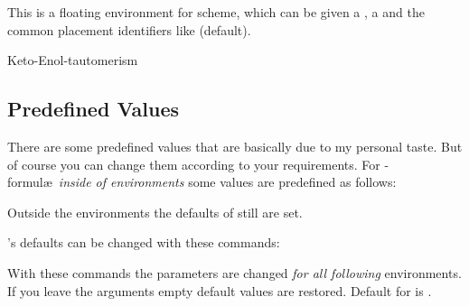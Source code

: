 \documentclass[toc=index,DIV10]{cnpkgdoc}
\begin{document}
This is a floating environment for scheme, which can be given a ,
a  and the common placement identifiers like  (default).
\begin{beispiel}
\begin{rxnscheme}{Keto-Enol-tautomerism}
 \arrow[,<=>]{}{}
\end{rxnscheme}
\end{beispiel}

\subsection{Predefined Values}
There are some predefined values that are basically due to my personal taste. But
of course you can change them according to your requirements. For %
-formul\ae\ \emph{inside of \mychemistry environments} some values are predefined
as follows:
\begin{beispiel}
 \setatomsep{1.8em}
 \setcrambond{3pt}{0.5pt}{1pt}
\end{beispiel}
Outside the \mychemistry environments the defaults of  still are
set.
\begin{beispiel}
 \begin{rxn}
 \end{rxn}
\end{beispiel}

\mychemistry's defaults can be changed with these commands:
\begin{beschreibung}
\end{beschreibung}
With these commands the parameters are changed \emph{for all following}
\mychemistry environments. If you leave the arguments empty default values are
restored. Default for  is .

\begin{beispiel}
 \setbondlength{2.1em}\setbondshape{5pt}{1pt}{2pt}\setatomsize{\Large}
 \begin{rxn}
 \end{rxn}
 \setbondlength{}\setbondshape{}{}{}\setatomsize{}
 \begin{rxn}
 \end{rxn}
\end{beispiel}
\end{document}
